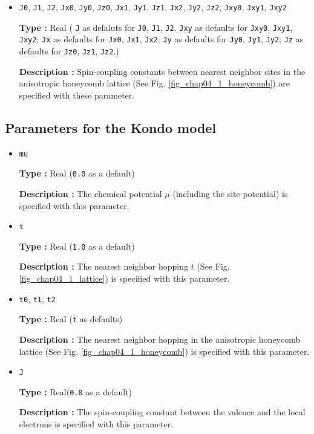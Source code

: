\begin{itemize}
{\bf Type :} Real (\verb|J'|, \verb|Jxy'|, \verb|Jz'|, \verb|Jx'|, and \verb|Jy'|
are set to  \verb|0.0|,  \verb|J'|, \verb|J'|, \verb|Jxy'|, and \verb|Jxy'| as defaults.)

{\bf Description :} Spin-coupling constants between second nearest neighbor sites
(See Fig. \ref{fig_chap04_1_lattice}) are specified with these parameter.
They are set as 
\verb|J|, \verb|Jx|, \verb|Jy|, \verb|Jz|, and \verb|Jxy| are set.

\item \verb|J0|, \verb|J1|, \verb|J2|, \verb|Jx0|, \verb|Jy0|, \verb|Jz0|, 
  \verb|Jx1|, \verb|Jy1|, \verb|Jz1|, 
  \verb|Jx2|, \verb|Jy2|, \verb|Jz2|, \verb|Jxy0|, \verb|Jxy1|, \verb|Jxy2|

{\bf Type :} Real (
\verb|J| as defaluts for \verb|J0|, \verb|J1|, \verb|J2|. 
\verb|Jxy| as defaults for \verb|Jxy0|, \verb|Jxy1|,  \verb|Jxy2|;
\verb|Jx| as defaults for \verb|Jx0|, \verb|Jx1|, \verb|Jx2|;
\verb|Jy| as defaults for \verb|Jy0|, \verb|Jy1|, \verb|Jy2|;
\verb|Jz| as defaults for \verb|Jz0|, \verb|Jz1|, \verb|Jz2|.)

{\bf Description :} Spin-coupling constants between nearest neighbor sites
in the anisotropic honeycomb lattice
(See Fig. \ref{fig_chap04_1_honeycomb}) are specified with these parameter.

\end{itemize}

\subsection{Parameters for the Kondo model}
\begin{itemize}
\item \verb|mu|

{\bf Type :} Real (\verb|0.0| as a default)

{\bf Description :} The chemical potential $\mu$ (including the site potential)
is specified with this parameter.

\item \verb|t|

{\bf Type :} Real (\verb|1.0| as a default)

{\bf Description :} The nearest neighbor hopping $t$ (See Fig. \ref{fig_chap04_1_lattice})
is specified with this parameter.

\item \verb|t0|, \verb|t1|, \verb|t2|

{\bf Type :} Real (\verb|t| as defaults)

{\bf Description :} The nearest neighbor hopping 
in the anisotropic honeycomb lattice 
(See Fig. \ref{fig_chap04_1_honeycomb})
is specified with this parameter.

\item \verb|J|

{\bf Type :} Real(\verb|0.0| as a default)

{\bf Description :} The spin-coupling constant between the valence and the local electrons
is specified with this parameter.

\end{itemize}

